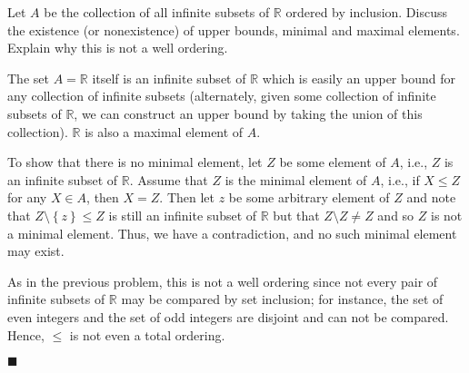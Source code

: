 \documentclass[12pt]{article}
\renewcommand{\qed}{\hfill$\blacksquare$}
\renewenvironment{proof}{\begin{addmargin}[1em]{0em}\begin{newproof}}{\end{newproof}\end{addmargin}\qed}
\newenvironment{problem}[2][Exercise]{\begin{trivlist}
\item[\hskip \labelsep {\bfseries #1}\hskip \labelsep {\bfseries #2.}]}{\end{trivlist}}
\begin{document}
\begin{problem}{I.2.2}
Let $A$ be the collection of all infinite subsets of $\mathbb{R}$ ordered by inclusion. Discuss the existence (or nonexistence) of upper bounds, minimal and maximal elements. Explain why this is not a well ordering. 
\end{problem}
\begin{proof}
The set $A=\mathbb{R}$ itself is an infinite subset of $\mathbb{R}$ which is easily an upper bound for any collection of infinite subsets (alternately, given some collection of infinite subsets of $\mathbb{R}$, we can construct an upper bound by taking the union of this collection). $\mathbb{R}$ is also a maximal element of $A$.

To show that there is no minimal element, let $Z$ be some element of $A$, i.e., $Z$ is an infinite subset of $\mathbb{R}$. Assume that $Z$ is the minimal element of $A$, i.e., if $X \leq Z $ for any $X \in A$, then $X=Z$. Then let $z$ be some arbitrary element of $Z$ and note that $Z \setminus \left\{z\right\} \leq Z$ is still an infinite subset of $\mathbb{R}$ but that $Z\setminus Z \neq Z$ and so $Z$ is not a minimal element. Thus, we have a contradiction, and no such minimal element may exist.

As in the previous problem, this is not a well ordering since not every pair of infinite subsets of $\mathbb{R}$ may be compared by set inclusion; for instance, the set of even integers and the set of odd integers are disjoint and can not be compared. Hence, $\leq$ is not even a total ordering.
\end{proof}
\end{document}
